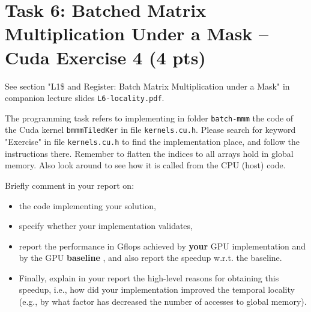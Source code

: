 \documentclass{article}
\begin{document}

\section{Task 6: Batched Matrix Multiplication Under a Mask -- Cuda Exercise 4 (4 pts)}

See section "L1\$ and Register: Batch Matrix Multiplication under a Mask" in companion lecture slides \texttt{L6-locality.pdf}.

The programming task refers to implementing in folder \texttt{batch-mmm} the code of the Cuda kernel \texttt{bmmmTiledKer} in file \texttt{kernels.cu.h}. Please search for keyword "Exercise" in file \texttt{kernels.cu.h} to find the implementation place, and follow the instructions there. Remember to flatten the indices to all arrays hold in global memory. Also look around to see how it is called from the CPU (host) code.

Briefly comment in your report on:

\begin{itemize}
    \item the code implementing your solution,
    \item specify whether your implementation validates,
    \item report the performance in Gflops achieved by \textbf{your} GPU implementation
    and by the GPU \textbf{baseline} , and also report the speedup w.r.t. the
    baseline.
    \item Finally, explain in your report the high-level reasons for obtaining
    this speedup, i.e., how did your implementation improved the temporal
    locality (e.g., by what factor has decreased the number of accesses to
    global memory).
\end{itemize}
\end{document}

